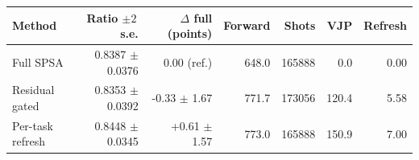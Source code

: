 \begin{tabular}{lrrrrrr}
\toprule
Method & Ratio $\pm2\,$s.e. & $\Delta$ full (points) & Forward & Shots & VJP & Refresh \\
\midrule
Full SPSA & 0.8387 $\pm$ 0.0376 & 0.00 (ref.) & 648.0 & 165888 & 0.0 & 0.00 \\
Residual gated & 0.8353 $\pm$ 0.0392 & -0.33 $\pm$ 1.67 & 771.7 & 173056 & 120.4 & 5.58 \\
Per-task refresh & 0.8448 $\pm$ 0.0345 & +0.61 $\pm$ 1.57 & 773.0 & 165888 & 150.9 & 7.00 \\
\bottomrule
\end{tabular}
